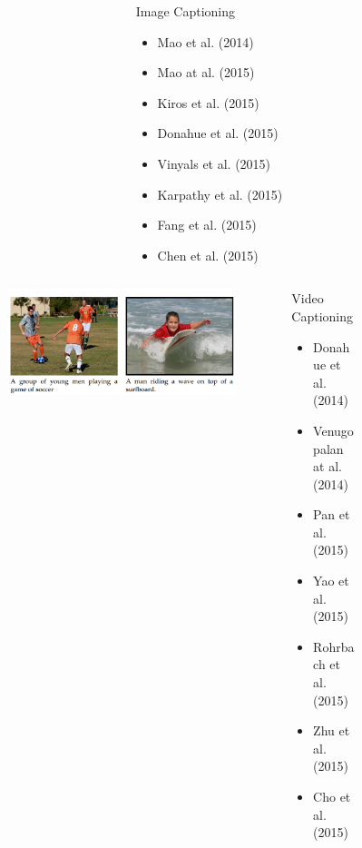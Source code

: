 \documentclass{beamer}
\begin{document}
\begin{frame}
\begin{figure}
\begin{minipage}[t][7cm][t]{\textwidth}
\begin{overprint}
\begin{columns}
\begin{column}{0.6\textwidth}
\begin{figure}[ht]
							\end{figure}
						\end{column}
						\begin{column}{0.4\textwidth}
							\begin{block}{Image Captioning
								}
								\begin{itemize}
									\item Mao et al. (2014) 
									\item Mao at al. (2015)
									\item Kiros et al. (2015)
									\item Donahue et al. (2015)
									\item Vinyals et al. (2015)
									\item Karpathy et al. (2015)
									\item Fang et al. (2015)
									\item Chen et al. (2015)
								\end{itemize}
							\end{block}
						\end{column}
					\end{columns}
					\onslide<10>
					\begin{columns}
						\begin{column}{0.6\textwidth}
							\begin{figure}[ht]
								\centering
								\includegraphics[width=1\linewidth]{images/vc}
								\label{fig:vc}
								
							\end{figure}
						\end{column}
						\begin{column}{0.4\textwidth}
							\begin{block}{Video Captioning
								}
								\begin{itemize}
									\item Donahue et al. (2014) 
									\item Venugopalan at al. (2014)
									\item Pan et al. (2015)
									\item Yao et al. (2015)
									\item Rohrbach et al. (2015)
									\item Zhu et al. (2015)
									\item Cho et al. (2015)
									

\end{itemize}
\end{block}
\end{column}
\end{columns}
\end{overprint}
\end{minipage}
\end{figure}
\end{frame}
\end{document}

